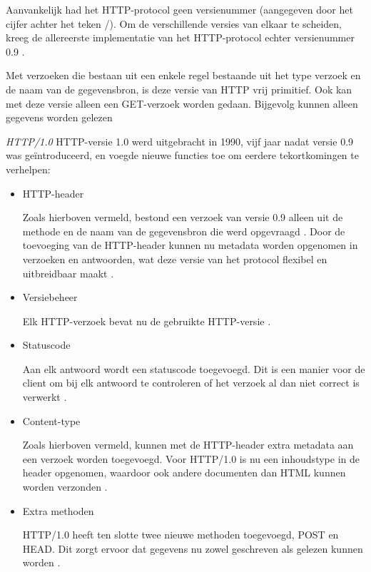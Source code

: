 Aanvankelijk had het HTTP-protocol geen versienummer (aangegeven door het cijfer achter het teken /). Om de verschillende versies van elkaar te scheiden, kreeg de allereerste implementatie van het HTTP-protocol echter versienummer 0.9 \autocite{MDN2023a}.

Met verzoeken die bestaan uit een enkele regel bestaande uit het type verzoek en de naam van de gegevensbron, is deze versie van HTTP vrij primitief. Ook kan met deze versie alleen een GET-verzoek worden gedaan. Bijgevolg kunnen alleen gegevens worden gelezen \autocite{Grigorik}


\emph{HTTP/1.0}
HTTP-versie 1.0 werd uitgebracht in 1990, vijf jaar nadat versie 0.9 was geïntroduceerd, en voegde nieuwe functies toe om eerdere tekortkomingen te verhelpen:

\begin{itemize}
    \item HTTP-header
    
    Zoals hierboven vermeld, bestond een verzoek van versie 0.9 alleen uit de methode en de naam van de gegevensbron die werd opgevraagd \autocite{FulberGarcia2022}.
    Door de toevoeging van de HTTP-header kunnen nu metadata worden opgenomen in verzoeken en antwoorden, wat deze versie van het protocol flexibel en uitbreidbaar maakt \autocite{MDN2023a}.
    
    \item Versiebeheer
    
    Elk HTTP-verzoek bevat nu de gebruikte HTTP-versie \autocite{MDN2023a}.
    
    \item Statuscode
    
    Aan elk antwoord wordt een statuscode toegevoegd. Dit is een manier voor de client om bij elk antwoord te controleren of het verzoek al dan niet correct is verwerkt \autocite{FulberGarcia2022}.
    
    \item Content-type
    
    Zoals hierboven vermeld, kunnen met de HTTP-header extra metadata aan een verzoek worden toegevoegd. Voor HTTP/1.0 is nu een inhoudstype in de header opgenomen, waardoor ook andere documenten dan HTML kunnen worden verzonden \autocite{FulberGarcia2022}.
    
    \item Extra methoden
    
    HTTP/1.0 heeft ten slotte twee nieuwe methoden toegevoegd, POST en HEAD. Dit zorgt ervoor dat gegevens nu zowel geschreven als gelezen kunnen worden \autocite{FulberGarcia2022}.
\end{itemize}



